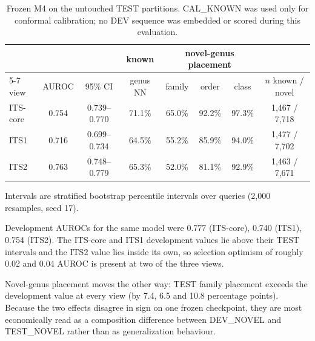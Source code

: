 \begin{table}[htbp]\centering
\begin{threeparttable}
\caption{Frozen M4 on the untouched TEST partitions. CAL\_KNOWN was used only for conformal calibration; no DEV sequence was embedded or scored during this evaluation.}
\label{tab:final}
\small
\begin{tabular}{lccccccc}
\toprule
 & & & known & \multicolumn{3}{c}{novel-genus placement} & \\
\cmidrule(lr){5-7}
view & AUROC & 95\% CI & genus NN & family & order & class & $n$ known / novel \\
\midrule
ITS-core & 0.754 & 0.739--0.770 & 71.1\% & 65.0\% & 92.2\% & 97.3\% & 1,467 / 7,718 \\
ITS1 & 0.716 & 0.699--0.734 & 64.5\% & 55.2\% & 85.9\% & 94.0\% & 1,477 / 7,702 \\
ITS2 & 0.763 & 0.748--0.779 & 65.3\% & 52.0\% & 81.1\% & 92.9\% & 1,463 / 7,671 \\
\bottomrule
\end{tabular}
\begin{tablenotes}\footnotesize
\item Intervals are stratified bootstrap percentile intervals over queries (2,000 resamples, seed 17).
\item Development AUROCs for the same model were 0.777 (ITS-core), 0.740 (ITS1), 0.754 (ITS2). The ITS-core and ITS1 development values lie above their TEST intervals and the ITS2 value lies inside its own, so selection optimism of roughly 0.02 and 0.04 AUROC is present at two of the three views.
\item Novel-genus placement moves the other way: TEST family placement exceeds the development value at every view (by 7.4, 6.5 and 10.8 percentage points). Because the two effects disagree in sign on one frozen checkpoint, they are most economically read as a composition difference between DEV\_NOVEL and TEST\_NOVEL rather than as generalization behaviour.
\end{tablenotes}
\end{threeparttable}
\end{table}
